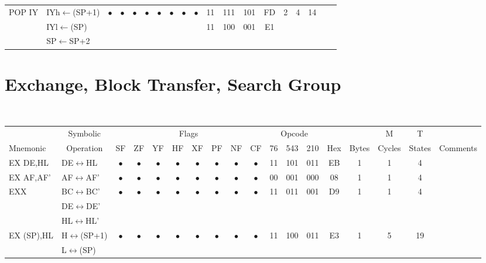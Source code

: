 \documentclass[oneside,a4paper]{book}
\begin{document}
{\begin{tabular}{llc@{ }c@{ }c@{ }c@{ }c@{ }c@{ }c@{ }cc@{ }c@{ }cccccll}
POP IY & IYh$\leftarrow$(SP+1) &
	$\bullet$ & $\bullet$ & $\bullet$ & $\bullet$ & $\bullet$ & $\bullet$ & $\bullet$ & $\bullet$ & 11 & 111 & 101 
	& FD & 2 & 4 & 14 & & \\ 
	& IYl$\leftarrow$(SP) & \multicolumn{8}{c}{} & 11 & 100 & 001 & E1 & \multicolumn{3}{c}{} & & \\
	& SP$\leftarrow$SP+2 & \multicolumn{15}{c}{} & & \\ \hline

\end{tabular}
}

\section{Exchange, Block Transfer, Search Group}

{\tt \scriptsize \setlength{\fboxsep}{0.25mm}
\setlength{\tabcolsep}{1mm}
\begin{tabular}{llc@{ }c@{ }c@{ }c@{ }c@{ }c@{ }c@{ }cc@{ }c@{ }cccccll}\hline
 & \multicolumn{1}{c}{Symbolic} & \multicolumn{8}{c}{Flags} & \multicolumn{3}{c}{Opcode} & & & M & T & \\
Mnemonic & \multicolumn{1}{c}{Operation} & SF & ZF & YF & HF & XF & PF & NF & CF & 76 & 543 & 210 
	& Hex & Bytes & Cycles & States & \multicolumn{2}{l}{Comments} \\ \hline

EX DE,HL & DE$\leftrightarrow$HL & 
	$\bullet$ & $\bullet$ & $\bullet$ & $\bullet$ & $\bullet$ & $\bullet$ & $\bullet$ & $\bullet$ & 11 & 101 & 011
	& EB & 1 & 1 & 4 & & \\ 

EX AF,AF' & AF$\leftrightarrow$AF' & 
	$\bullet$ & $\bullet$ & $\bullet$ & $\bullet$ & $\bullet$ & $\bullet$ & $\bullet$ & $\bullet$ & 00 & 001 & 000
	& 08 & 1 & 1 & 4 & & \\ 

EXX & BC$\leftrightarrow$BC' & 
	$\bullet$ & $\bullet$ & $\bullet$ & $\bullet$ & $\bullet$ & $\bullet$ & $\bullet$ & $\bullet$ & 11 & 011 & 001
	& D9 & 1 & 1 & 4 & & \\ 
	& DE$\leftrightarrow$DE' & \multicolumn{15}{c}{} & & \\ 
	& HL$\leftrightarrow$HL' & \multicolumn{15}{c}{} & & \\ 

EX (SP),HL & H$\leftrightarrow$(SP+1) & 
	$\bullet$ & $\bullet$ & $\bullet$ & $\bullet$ & $\bullet$ & $\bullet$ & $\bullet$ & $\bullet$ & 11 & 100 & 011
	& E3 & 1 & 5 & 19 & & \\ 
	& L$\leftrightarrow$(SP) & \multicolumn{15}{c}{} & & \\ 


\end{tabular}}
\end{document}
